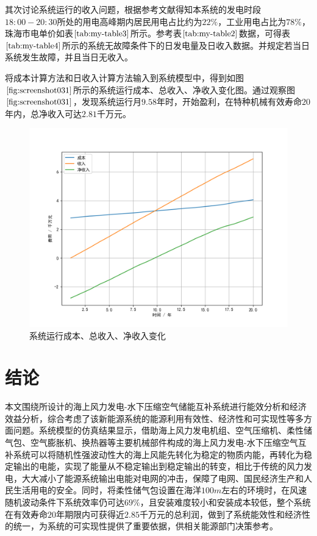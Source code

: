 \documentclass{jnuthesis}
\begin{document}
	\par 其次讨论系统运行的收入问题，根据参考文献\cite{b4}得知本系统的发电时段$ 18:00-20:30 $所处的用电高峰期内居民用电占比约为$ 22\% $，工业用电占比为$ 78\% $，珠海市电单价如表$ \fontsize{10.5bp}{10pt}\ref{tab:my-table3} $所示。参考表$ \fontsize{10.5bp}{10pt}\ref{tab:my-table2} $数据，可得表$ \fontsize{10.5bp}{10pt}\ref{tab:my-table4} $所示的系统无故障条件下的日发电量及日收入数据。并规定若当日系统发生故障，并且当日无收入。\\
	
	\par 将成本计算方法和日收入计算方法输入到系统模型中，得到如图$ \fontsize{10.5bp}{10pt}\ref{fig:screenshot031} $所示的系统运行成本、总收入、净收入变化图。通过观察图$ \fontsize{10.5bp}{10pt}\ref{fig:screenshot031} $，发现系统运行月$ 9.58 $年时，开始盈利，在特种机械有效寿命$ 20 $年内，总净收入可达$ 2.81 $千万元。
	
	\begin{figure}[H]
		\centering
		\includegraphics[width=0.7\linewidth]{pictures/screenshot031}
		\caption{\fontsize{10.5bp}{10pt}系统运行成本、总收入、净收入变化}
		\label{fig:screenshot031}
	\end{figure}
	
	\chapter*{结论}
	
	\par 本文围绕所设计的海上风力发电-水下压缩空气储能互补系统进行能效分析和经济效益分析，综合考虑了该新能源系统的能源利用有效性、经济性和可实现性等多方面问题。系统模型的仿真结果显示，借助海上风力发电机组、空气压缩机、柔性储气包、空气膨胀机、换热器等主要机械部件构成的海上风力发电-水下压缩空气互补系统可以将随机性强波动性大的海上风能先转化为稳定的物质内能，再转化为稳定输出的电能，实现了能量从不稳定输出到稳定输出的转变，相比于传统的风力发电，大大减小了能源系统输出电能对电网的冲击，保障了电网、国民经济生产和人民生活用电的安全。同时，将柔性储气包设置在海洋$ 100m $左右的环境时，在风速随机波动条件下系统效率仍可达$ 69\% $，且安装难度较小和安装成本较低，整个系统在有效寿命$ 20 $年期限内可获得近$ 2.85 $千万元的总利润，做到了系统能效性和经济性的统一，为系统的可实现性提供了重要依据，供相关能源部门决策参考。
	
\end{document}
